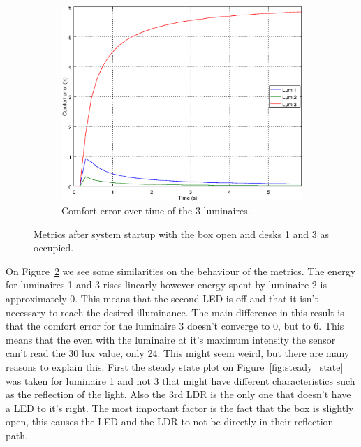 \begin{figure}[ht]
\begin{subfigure}[t]{0.32\textwidth}
    \centering
    \includegraphics[width=.95\textwidth]{img/n_open_o101}
    \caption{Comfort error over time of the 3 luminaires.}
    \label{fig:n_open_o101}
    \end{subfigure}
    \caption{Metrics after system startup with the box open and desks 1 and 3 as occupied.}
    \label{fig:open_o101}
\end{figure}


On Figure~\ref{fig:open_o101} we see some similarities on the behaviour of the metrics. The energy for luminaires 1 and 3 rises linearly however energy spent by luminaire 2 is approximately 0. This means that the second LED is off and that it isn't necessary to reach the desired illuminance. The main difference in this result is that the comfort error for the luminaire 3 doesn't converge to 0, but to 6. This means that the even with the luminaire at it's maximum intensity the sensor can't read the 30 lux value, only 24. This might seem weird, but there are many reasons to explain this. First the steady state plot on Figure~\ref{fig:steady_state} was taken for luminaire 1 and not 3 that might have different characteristics such as the reflection of the light. Also the 3rd LDR is the only one that doesn't have a LED to it's right. The most important factor is the fact that the box is slightly open, this causes the LED and the LDR to not be directly in their reflection path.

